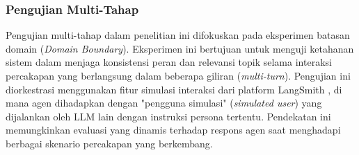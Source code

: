 \subsubsection{Pengujian Multi-Tahap}
Pengujian multi-tahap dalam penelitian ini difokuskan pada eksperimen batasan domain (\textit{Domain Boundary}). Eksperimen ini bertujuan untuk menguji ketahanan sistem dalam menjaga konsistensi peran dan relevansi topik selama interaksi percakapan yang berlangsung dalam beberapa giliran (\textit{multi-turn}). Pengujian ini diorkestrasi menggunakan fitur simulasi interaksi dari platform LangSmith \parencite{langchain_multiturn_simulation}, di mana agen dihadapkan dengan "pengguna simulasi" (\textit{simulated user}) yang dijalankan oleh LLM lain dengan instruksi persona tertentu. Pendekatan ini memungkinkan evaluasi yang dinamis terhadap respons agen saat menghadapi berbagai skenario percakapan yang berkembang.

